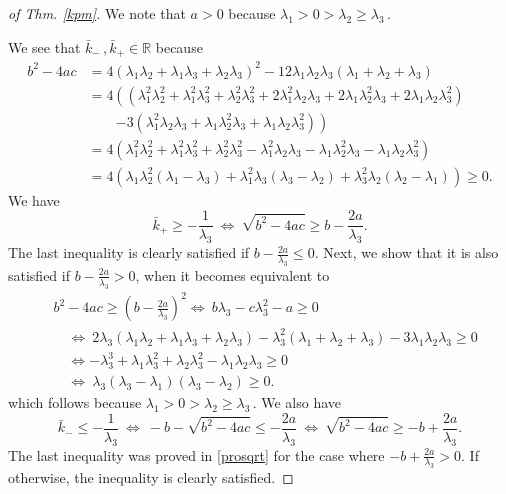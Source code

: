 \documentclass[smallextended]{svjour3hack}       %
\begin{document}
\begin{proof}[of Thm. \ref{kpm}]
We note that $a>0$ because $\lambda_1>0>\lambda_2\geq \lambda_3$\,.

We see that $\bar{k}_{-}\,,\bar{k}_{+}\in\mathbb{R}$ because 
\[
\begin{array}{ll}
    b^2-4ac &= 4(\lambda_1\lambda_2+\lambda_1\lambda_3+\lambda_2\lambda_3)^2- 12\lambda_1\lambda_2\lambda_3( \lambda_1+\lambda_2+\lambda_3)\\ 
    &=4\left((\lambda_1^2\lambda_2^2+\lambda_1^2\lambda_3^2+\lambda_2^2\lambda_3^2 + 2\lambda_1^2\lambda_2\lambda_3+ 2\lambda_1\lambda_2^2\lambda_3+ 2\lambda_1\lambda_2\lambda_3^2)\right.\\
    & \quad\quad \left. - 3(\lambda_1^2\lambda_2\lambda_3 + \lambda_1\lambda_2^2\lambda_3 + \lambda_1\lambda_2\lambda_3^2)\right)\\
    &=4\left(\lambda_1^2\lambda_2^2+\lambda_1^2\lambda_3^2+\lambda_2^2\lambda_3^2 -\lambda_1^2\lambda_2\lambda_3- \lambda_1\lambda_2^2\lambda_3-\lambda_1\lambda_2\lambda_3^2\right) \\
    &=4\left( \lambda_1\lambda_2^2(\lambda_1-\lambda_3) + \lambda_1^2\lambda_3(\lambda_3-\lambda_2) +\lambda_3^2\lambda_2(\lambda_2- \lambda_1)\right) \geq 0.
\end{array}
\]
We have 
\[
    \bar{k}_{+}\geq -\frac{1}{\lambda_3}~\Leftrightarrow ~ \sqrt{b^2-4ac}\geq b-\frac{2a}{\lambda_3}.
    \]
    The last inequality is clearly satisfied  if 
$b - \frac{2a}{\lambda_3}\leq 0$. Next, we show that it is also satisfied if 
$b - \frac{2a}{\lambda_3}> 0$, when it becomes equivalent to
\begin{equation}\label{prosqrt}
\begin{array}{ll}
&b^2-4ac\geq \left(b-\frac{2a}{\lambda_3}\right)^2
\Leftrightarrow~ b\lambda_3-c\lambda_3^2-a\geq 0\\[1pt]
&\quad\Leftrightarrow~ 2\lambda_3(\lambda_1\lambda_2+\lambda_1\lambda_3+\lambda_2\lambda_3) - \lambda_3^2(\lambda_1+\lambda_2+\lambda_3) - 3\lambda_1\lambda_2\lambda_3 \geq 0\\[1pt]
&\quad \Leftrightarrow-\lambda_3^3+ \lambda_1\lambda_3^2 +\lambda_2\lambda_3^2  - \lambda_1\lambda_2\lambda_3 \geq 0\\[1pt]
&\quad\Leftrightarrow~
\lambda_3(\lambda_3-\lambda_1)(\lambda_3-\lambda_2)\geq 0.
\end{array}
\end{equation}
which follows because $\lambda_1>0>\lambda_2\geq \lambda_3$\,. We also have
\[
\bar{k}_{-}\leq -\frac{1}{\lambda_3}~\Leftrightarrow ~ -b-\sqrt{b^2-4ac}\leq -\frac{2a}{\lambda_3}~\Leftrightarrow ~ \sqrt{b^2-4ac}\geq -b+\frac{2a}{\lambda_3}. 
\]
     The last inequality  was proved in \eqref{prosqrt} for the case where  $ -b+\frac{2a}{\lambda_3}>0$. If otherwise, the inequality is clearly satisfied.


\end{proof}
\end{document}
